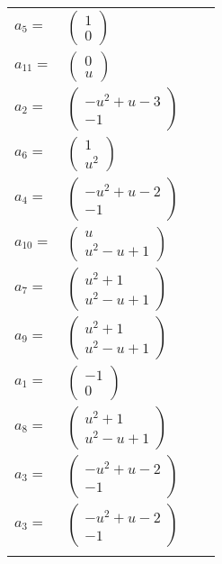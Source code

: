 \documentclass[1p]{elsarticle_modified}
\theoremstyle{definition}
\begin{document}
\begin{tabular}{m{7pt} m{180pt} m{7pt} m{180pt} }
\flushright $a_{5}=$&$\begin{pmatrix}1\\0\end{pmatrix}$ \\
\flushright $a_{11}=$&$\begin{pmatrix}0\\u\end{pmatrix}$ \\
\flushright $a_{2}=$&$\begin{pmatrix}- u^2+u-3\\-1\end{pmatrix}$ \\
\flushright $a_{6}=$&$\begin{pmatrix}1\\u^2\end{pmatrix}$ \\
\flushright $a_{4}=$&$\begin{pmatrix}- u^2+u-2\\-1\end{pmatrix}$ \\
\flushright $a_{10}=$&$\begin{pmatrix}u\\u^2- u+1\end{pmatrix}$ \\
\flushright $a_{7}=$&$\begin{pmatrix}u^2+1\\u^2- u+1\end{pmatrix}$ \\
\flushright $a_{9}=$&$\begin{pmatrix}u^2+1\\u^2- u+1\end{pmatrix}$ \\
\flushright $a_{1}=$&$\begin{pmatrix}-1\\0\end{pmatrix}$ \\
\flushright $a_{8}=$&$\begin{pmatrix}u^2+1\\u^2- u+1\end{pmatrix}$ \\
\flushright $a_{3}=$&$\begin{pmatrix}- u^2+u-2\\-1\end{pmatrix}$\\ \flushright $a_{3}=$&$\begin{pmatrix}- u^2+u-2\\-1\end{pmatrix}$\\&\end{tabular}
\end{document}
